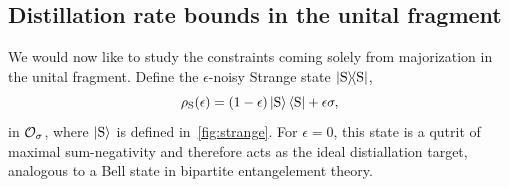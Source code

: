 \documentclass[pra,
aps,
twocolumn,
superscriptaddress,
groupedaddress,
nofootinbib,
reprint
]{revtex4-1}
\begin{document}

\null\newpage

\subsection{Distillation rate bounds in the unital fragment}\label{sec:lcsu}

We would now like to study the constraints coming solely from majorization in the unital fragment. 
Define the $\epsilon$-noisy Strange state $\ketbra{\rm{S}}$,
\begin{equation}
    \rho_{\rm{S}}(\epsilon) = (1 - \epsilon) \ket{\rm{S}}\bra{\rm{S}} + \epsilon \sigma,
\end{equation}
in $\mathcal{O}_\sigma$, where $\ket{\rm{S}}$ is defined in~\cref{fig:strange}. 
For $\epsilon=0$, this state is a qutrit of maximal sum-negativity  and therefore acts as the ideal distiallation target, analogous to a Bell state in bipartite entangelement theory.
\end{document}
